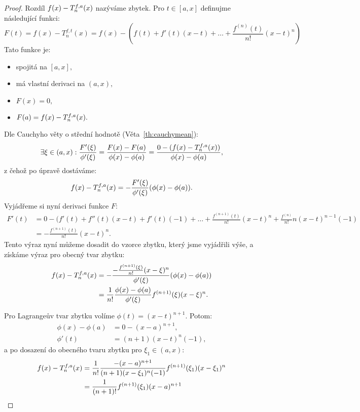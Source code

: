 \begin{proof}
    Rozdíl $f(x) - T_n^{f,a}(x)$ nazýváme zbytek. Pro $t \in [a,x]$ definujme 
    následující funkci:
    $$F(t) = f(x) - T_n^{f,t}(x) = f(x) - \left(f(t) + f'(t)(x-t) + \dots + \frac{f^{(n)}(t)}{n!}(x-t)^n\right)$$
    Tato funkce je:
    \begin{itemize}
        \item spojitá na $[a,x],$
        \item má vlastní derivaci na $(a,x),$
        \item $F(x) = 0,$
        \item $F(a) = f(x) - T_n^{f,a}(x).$ 
    \end{itemize}
    Dle Cauchyho věty o střední hodnotě (Věta~\ref{th:cauchymean}):
    $$\exists \xi \in (a,x): \frac{F'(\xi)}{\phi'(\xi)} = \frac{F(x) - F(a)}{\phi(x) - \phi(a)} = \frac{0 - (f(x) - T_n^{f,a}(x))}{\phi(x) - \phi(a)},$$
    z čehož po úpravě dostáváme:
    $$f(x) - T_n^{f,a}(x) = -\frac{F'(\xi)}{\phi'(\xi)}(\phi(x)-\phi(a)).$$
    Vyjádřeme si nyní derivaci funkce $F:$
    \begin{align*}
        F'(t)
        &= 0 - (f'(t) + f''(t)(x-t) + f'(t)(-1) + \dots + \frac{f^{(n+1)}(t)}{n!}(x-t)^n + \frac{f^{(n)}}{n!}n(x-t)^{n-1}(-1) \\
        &= -\frac{f^{(n+1)}(t)}{n!}(x-t)^n.
    \end{align*}
    Tento výraz nyní můžeme dosadit do vzorce zbytku, který jsme vyjádřili výše,
    a získáme výraz pro obecný tvar zbytku:
    \begin{align*}
        f(x) - T_n^{f,a}(x) 
        &= -\frac{-\frac{f^{(n+1)}(\xi)}{n!}(x-\xi)^n}{\phi'(\xi)}(\phi(x)-\phi(a)) \\
        &= \frac{1}{n!}\frac{\phi(x)-\phi(a)}{\phi'(\xi)}f^{(n+1)}(\xi)(x-\xi)^n.
    \end{align*}

    Pro Lagrangeův tvar zbytku volíme $\phi(t) = (x-t)^{n+1}.$ Potom:
    \begin{align*}
        \phi(x) - \phi(a) &= 0 - (x-a)^{n+1}, \\
        \phi'(t) &= (n+1)(x-t)^n(-1), 
    \end{align*}
    a po dosazení do obecného tvaru zbytku pro $\xi_1 \in (a,x):$
    \begin{align*}
        f(x) - T_n^{f,a}(x) 
        &= \frac{1}{n!}\frac{-(x-a)^{n+1}}{(n+1)(x-\xi_1)^n(-1)}f^{(n+1)}(\xi_1)(x-\xi_1)^n \\
        &=  \frac{1}{(n+1)!}f^{(n+1)}(\xi_1)(x-a)^{n+1} 
    \end{align*}
    

\end{proof}
